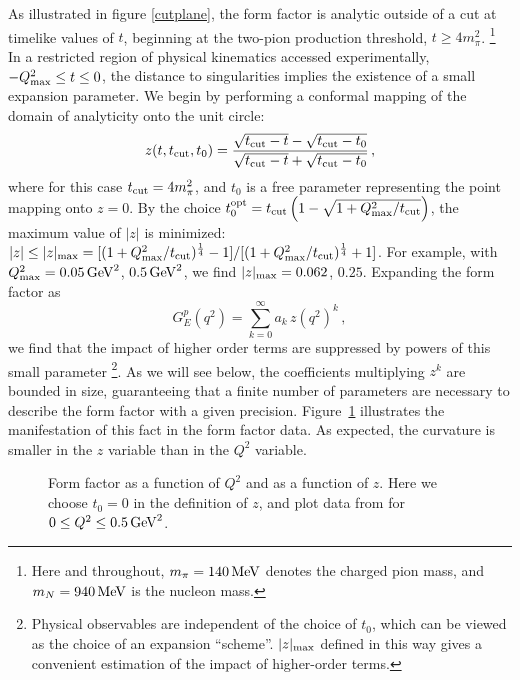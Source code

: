 \documentclass[12pt]{article}
\newcommand{\be}{\begin{equation}}
\newcommand{\ee}{\end{equation}}
\begin{document}
As illustrated in figure \ref{cutplane}, the form factor is analytic outside of a cut
at timelike values of $t$, \cite{Federbush:1958zz} beginning at the two-pion production threshold, 
$t\ge 4m_\pi^2$.%
\footnote{
Here and throughout, $m_\pi=140\,{\rm MeV}$ denotes the charged pion mass, 
and $m_N=940\,{\rm MeV}$ is the nucleon mass. 
}
In a restricted region of physical kinematics accessed 
experimentally, $-Q_{\rm max}^2 \le t \le 0$, the distance to singularities 
implies the existence of a small expansion parameter.   We begin by 
performing a conformal mapping of the domain of analyticity onto the unit circle: 
\be\label{eq:z}
z(t,t_{\rm cut},t_0) = {\sqrt{t_{\rm cut} - t} - \sqrt{t_{\rm cut} - t_0} \over \sqrt{t_{\rm cut} - t} + \sqrt{t_{\rm cut} - t_0}  } \,, 
\ee
where for this case $t_{\rm cut} = 4m_\pi^2$, and $t_0$ is a free parameter 
representing the point mapping onto $z=0$.   By the choice 
$t_0^{\rm opt} = t_{\rm cut} \left( 1 - \sqrt{1+ Q^2_{\rm max}/t_{\rm cut}} \right)$, the 
maximum value of $|z|$ is minimized: 
$|z| \le |z|_{\rm max} = [(1+Q_{\rm max}^2/t_{\rm cut})^\frac14 - 1]/[(1+Q_{\rm max}^2/t_{\rm cut})^\frac14 + 1]$. 
For example, with $Q^2_{\rm max} = 0.05\,{\rm GeV}^2$,  $0.5\,{\rm GeV}^2$, 
we find $|z|_{\rm max} = 0.062$, $0.25$.    Expanding the form factor as
\be \label{eq:zexpand}
G_E^p(q^2) = \sum_{k=0}^\infty a_k \, z(q^2)^k \,,
\ee
we find that the impact of higher order terms are suppressed by powers of
this small parameter%
%
\footnote{
Physical observables are independent of the choice of $t_0$, 
which can be viewed as the choice of an expansion ``scheme''.   
$|z|_{\rm max}$ defined in this way gives a convenient estimation of 
the impact of higher-order terms. 
}.
%   
As we will see below, the coefficients multiplying $z^k$ 
are bounded in size, guaranteeing that a finite number of parameters are necessary to 
describe the form factor with a given precision.  
Figure~\ref{fig:qz} illustrates the manifestation of this fact in the 
form factor data.   As expected, the curvature is smaller in the $z$ variable than in 
the $Q^2$ variable.  

\begin{figure}[h!]
\begin{center}
\caption{\label{fig:qz} Form factor as a function of $Q^2$ and as a function of $z$.  
Here we choose $t_0=0$ in the definition of $z$, 
and plot data from \cite{Arrington:2007ux} 
for $0\le Q^2 \le 0.5\,{\rm GeV}^2$.   
}
\end{center}
\end{figure}  
\end{document}
